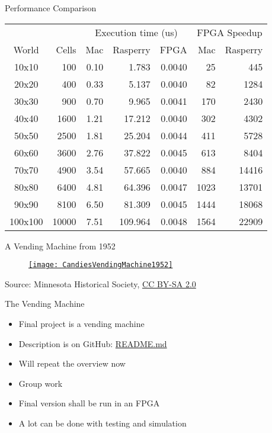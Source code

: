 \begin{frame}[fragile]{Performance Comparison}
\begin{table}
  \centering
\begin{tabular}{crrrrrr}
    \toprule
    & &\multicolumn{3}{c}{Execution time (us)} & \multicolumn{2}{c}{FPGA Speedup}\\
World & Cells&Mac&Rasperry&FPGA& Mac& Rasperry\\
\midrule
10x10 & 100&0.10&1.783&0.0040&25&445\\
20x20 & 400&0.33&5.137&0.0040&82&1284\\
30x30 & 900&0.70&9.965&0.0041&170&2430\\
40x40 & 1600&1.21&17.212&0.0040&302&4302\\
50x50 & 2500&1.81&25.204&0.0044&411&5728\\
60x60 & 3600&2.76&37.822&0.0045&613&8404\\
70x70 & 4900&3.54&57.665&0.0040&884&14416\\
80x80 & 6400&4.81&64.396&0.0047&1023&13701\\
90x90 & 8100&6.50&81.309&0.0045&1444&18068\\
100x100 & 10000&7.51&109.964&0.0048&1564&22909\\
\bottomrule
\end{tabular}
    \label{tab:speedup}
\end{table}
\end{frame}

\begin{frame}[fragile]{A Vending Machine from 1952}
\begin{figure}
    \centering
    \href{https://en.wikipedia.org/wiki/File:CandiesVendingMachine1952.jpg}{\texttt{[image: CandiesVendingMachine1952]}}

\end{figure}

{\tiny Source: Minnesota Historical Society, \href{https://creativecommons.org/licenses/by-sa/2.0}{CC BY-SA 2.0}}
\end{frame}

\begin{frame}[fragile]{The Vending Machine}
\begin{itemize}
\item Final project is a vending machine
\item Description is on GitHub: \href{https://github.com/schoeberl/chisel-lab/tree/master/vending}{README.md}
\item Will repeat the overview now
\item Group work
\item Final version shall be run in an FPGA
\item A lot can be done with testing and simulation
\end{itemize}
\end{frame}

